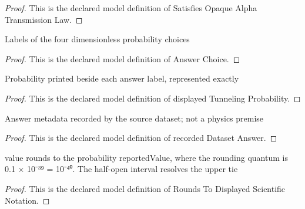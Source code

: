 \begin{proof}
  This is the declared model definition of Satisfies Opaque Alpha Transmission Law.
\end{proof}
\begin{definition}
  \label{def:physics:phyx-mini-0660:phyxminiproblems-problemphyxmini0660-answerchoice}
  Labels of the four dimensionless probability choices
\end{definition}
\begin{proof}
  This is the declared model definition of Answer Choice.
\end{proof}
\begin{definition}
  \label{def:physics:phyx-mini-0660:phyxminiproblems-problemphyxmini0660-displayedtunnelingprobability}
  Probability printed beside each answer label, represented exactly
\end{definition}
\begin{proof}
  This is the declared model definition of displayed Tunneling Probability.
\end{proof}
\begin{definition}
  \label{def:physics:phyx-mini-0660:phyxminiproblems-problemphyxmini0660-recordeddatasetanswer}
  Answer metadata recorded by the source dataset; not a physics premise
\end{definition}
\begin{proof}
  This is the declared model definition of recorded Dataset Answer.
\end{proof}
\begin{definition}
  \label{def:physics:phyx-mini-0660:phyxminiproblems-problemphyxmini0660-roundstodisplayedscientificnotation}
  value rounds to the probability reportedValue, where the rounding quantum is 0.1 × 10⁻³⁹ = 10⁻⁴⁰. The half-open interval resolves the upper tie
\end{definition}
\begin{proof}
  This is the declared model definition of Rounds To Displayed Scientific Notation.
\end{proof}
